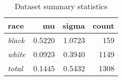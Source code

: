 \begin{wraptable}{r}{3in}

\caption{\label{tab:dataset_summary}Dataset summary statistics}
\centering
\fontsize{9}{11}\selectfont
\begin{tabular}[t]{>{}lrrr}
\toprule
race & mu & sigma & count\\
\midrule
\em{black} & 0.5220 & 1.0723 & 159\\
\em{white} & 0.0923 & 0.3940 & 1149\\
\em{total} & 0.1445 & 0.5432 & 1308\\
\bottomrule
\end{tabular}
\end{wraptable}
